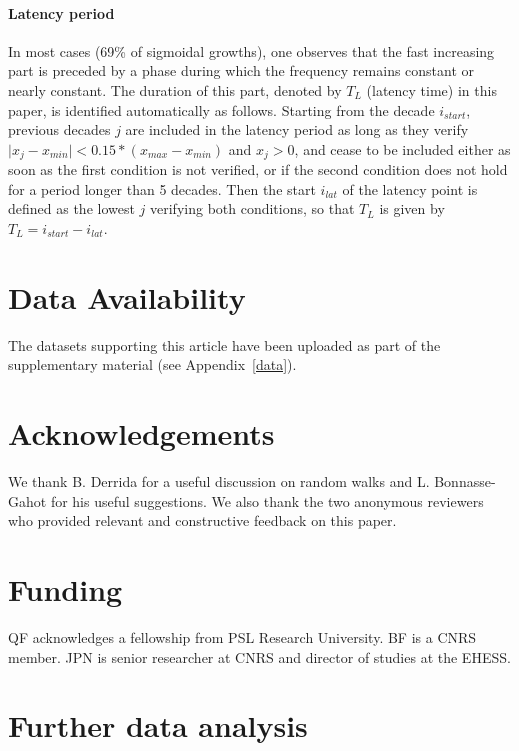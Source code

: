\documentclass[12pt,twocolumn,amsmath,amssymb,aps,longbibliography]{revtex4-1}  %
\begin{document}
\paragraph{Latency period}
In most cases (69\% of sigmoidal growths), one observes that the fast increasing part is preceded by a phase during which the frequency remains constant or nearly constant. The duration of this part, denoted by $T_L$ (latency time) in this paper, is identified automatically as follows. Starting from the decade $i_{start}$, previous decades $j$ are included in the latency period as long as they verify $ \lvert x_j - x_{min} \rvert < 0.15 * (x_{max} - x_{min})$ and $x_j > 0$, and cease to be included either as soon as the first condition is not verified, or if the second condition does not hold for a period longer than 5 decades. Then the start $i_{lat}$ of the latency point is defined as the lowest $j$ verifying both conditions, so that $T_L$ is given by $T_L = i_{start} - i_{lat}$. 

\section*{Data Availability}

The datasets supporting this article have been uploaded as part of the supplementary material (see Appendix~\ref{data}).

\section*{Acknowledgements}

We thank B. Derrida for a useful discussion on random walks and L. Bonnasse-Gahot for his useful suggestions. We also thank the two anonymous reviewers who provided relevant and constructive feedback on this paper.

\section*{Funding}

QF acknowledges a fellowship from PSL Research University. BF is a CNRS member. JPN is senior researcher at CNRS and director of studies at the EHESS.

\newpage



\appendix 

\onecolumngrid

\newpage

\section{Further data analysis}
\end{document}
